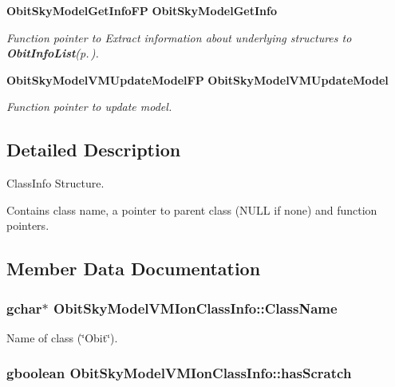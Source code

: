 \begin{CompactItemize}
{\bf Obit\-Sky\-Model\-Get\-Info\-FP} {\bf Obit\-Sky\-Model\-Get\-Info}
\begin{CompactList}\small\item\em Function pointer to Extract information about underlying structures to {\bf Obit\-Info\-List}{\rm (p.\,\pageref{structObitInfoList})}. \item\end{CompactList}\item 
{\bf Obit\-Sky\-Model\-VMUpdate\-Model\-FP} {\bf Obit\-Sky\-Model\-VMUpdate\-Model}
\begin{CompactList}\small\item\em Function pointer to update model. \item\end{CompactList}\end{CompactItemize}


\subsection{Detailed Description}
Class\-Info Structure. 

Contains class name, a pointer to parent class (NULL if none) and function pointers. 



\subsection{Member Data Documentation}
\subsubsection{\setlength{\rightskip}{0pt plus 5cm}gchar$\ast$ {\bf Obit\-Sky\-Model\-VMIon\-Class\-Info::Class\-Name}}\label{structObitSkyModelVMIonClassInfo_o2}


Name of class (\char`\"{}Obit\char`\"{}). 

\subsubsection{\setlength{\rightskip}{0pt plus 5cm}gboolean {\bf Obit\-Sky\-Model\-VMIon\-Class\-Info::has\-Scratch}}\label{structObitSkyModelVMIonClassInfo_o1}



